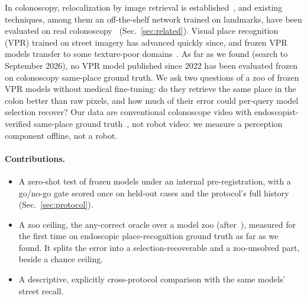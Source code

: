 In colonoscopy, relocalization by image retrieval is
established~\cite{ma2021colon10k,morlana2024colonmapper}, and existing
techniques, among them an off-the-shelf network trained on landmarks, have
been evaluated on real colonoscopy~\cite{ma2021colon10k,morlana2021selfsupervised}
(Sec.~\ref{sec:related}).
Visual place recognition (VPR) trained on street imagery has advanced quickly
since, and frozen VPR models transfer to some texture-poor
domains~\cite{keetha2024anyloc,larsen2026longterm}. As far as we found
(search to September 2026), no VPR model published since 2022 has been
evaluated frozen on colonoscopy same-place ground truth. We ask two
questions of a zoo of frozen VPR models without medical fine-tuning: do they
retrieve the same place in the colon better than raw pixels, and how much of
their error could per-query model selection recover? Our data are
conventional colonoscope video with endoscopist-verified same-place ground
truth~\cite{ma2021colon10k}, not robot video: we measure a perception
component offline, not a robot.

\paragraph{Contributions.}
\begin{itemize}
\item[\textbf{C1}] A zero-shot test of  frozen models under an
  internal pre-registration, with a go/no-go gate scored once on held-out
  cases and the protocol's full history (Sec.~\ref{sec:protocol}).
\item[\textbf{C2}] A zoo ceiling, the any-correct oracle over a model zoo
  (after~\cite{waheed2021improving}), measured for the first time on
  endoscopic place-recognition ground truth as far as we found. It splits
  the error into a selection-recoverable and a zoo-unsolved part, beside a
  chance ceiling.
\item[\textbf{C3}] A descriptive, explicitly cross-protocol comparison with
  the same models' street recall.
\end{itemize}
